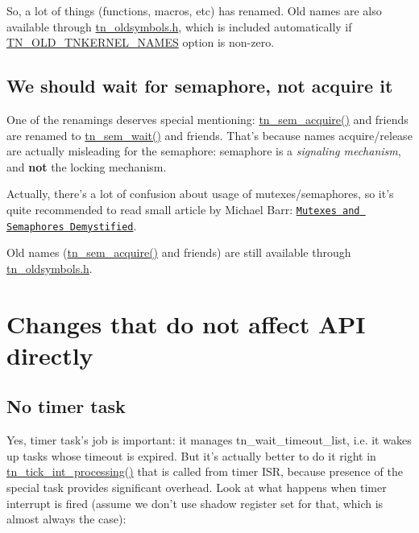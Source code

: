So, a lot of things (functions, macros, etc) has renamed. Old names are also available through {\ttfamily \hyperlink{tn__oldsymbols_8h}{tn\+\_\+oldsymbols.\+h}}, which is included automatically if {\ttfamily \hyperlink{tn__cfg__default_8h_ae9854c723c6a823c9126aa8390977d39}{T\+N\+\_\+\+O\+L\+D\+\_\+\+T\+N\+K\+E\+R\+N\+E\+L\+\_\+\+N\+A\+M\+E\+S}} option is non-\/zero.\hypertarget{tnkernel_diff_tnkernel_diff_api_rename_sem}{}\subsection{We should wait for semaphore, not acquire it}\label{tnkernel_diff_tnkernel_diff_api_rename_sem}
One of the renamings deserves special mentioning\+: {\ttfamily \hyperlink{tn__oldsymbols_8h_abdc5c428590ff525cdb566da613015ce}{tn\+\_\+sem\+\_\+acquire()}} and friends are renamed to {\ttfamily \hyperlink{tn__sem_8h_a6bf88a78f4f8b2799f72ee671b52ed97}{tn\+\_\+sem\+\_\+wait()}} and friends. That's because names acquire/release are actually misleading for the semaphore\+: semaphore is a {\itshape signaling mechanism}, and {\bfseries not} the locking mechanism.

Actually, there's a lot of confusion about usage of mutexes/semaphores, so it's quite recommended to read small article by Michael Barr\+: \href{http://goo.gl/YprPBW}{\tt Mutexes and Semaphores Demystified}.

Old names ({\ttfamily \hyperlink{tn__oldsymbols_8h_abdc5c428590ff525cdb566da613015ce}{tn\+\_\+sem\+\_\+acquire()}} and friends) are still available through {\ttfamily \hyperlink{tn__oldsymbols_8h}{tn\+\_\+oldsymbols.\+h}}.\hypertarget{tnkernel_diff_tnkernel_diff_other}{}\section{Changes that do not affect A\+P\+I directly}\label{tnkernel_diff_tnkernel_diff_other}
\hypertarget{tnkernel_diff_tnkernel_diff_timer_task}{}\subsection{No timer task}\label{tnkernel_diff_tnkernel_diff_timer_task}
Yes, timer task's job is important\+: it manages {\ttfamily tn\+\_\+wait\+\_\+timeout\+\_\+list}, i.\+e. it wakes up tasks whose timeout is expired. But it's actually better to do it right in {\ttfamily \hyperlink{tn__sys_8h_a944d96c7a5d442d271115b6cb22a085b}{tn\+\_\+tick\+\_\+int\+\_\+processing()}} that is called from timer I\+S\+R, because presence of the special task provides significant overhead. Look at what happens when timer interrupt is fired (assume we don't use shadow register set for that, which is almost always the case)\+:

